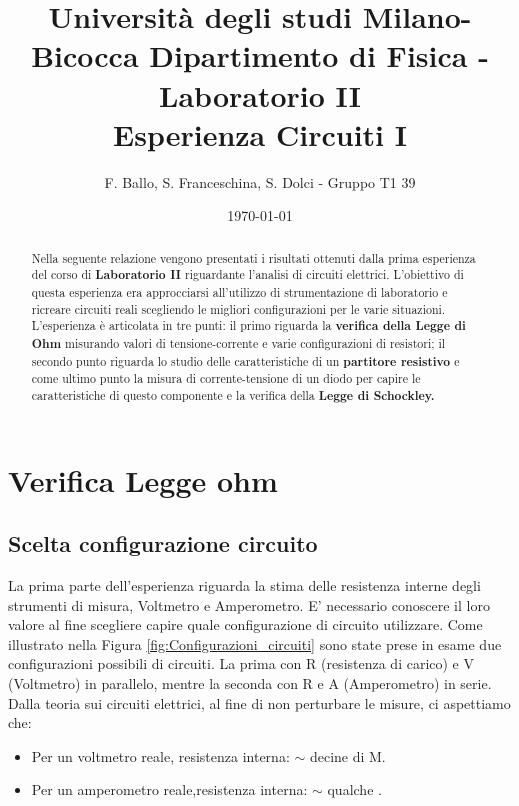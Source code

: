\documentclass[letterpaper,12pt]{article}
\begin{document}
\title{{\small Università degli studi Milano-Bicocca  Dipartimento di Fisica - Laboratorio II }\\
    Esperienza Circuiti I}
\author{F. Ballo, S. Franceschina, S. Dolci - Gruppo T1 39}
\date{\today}
\maketitle
\thispagestyle{logoheader}


\begin{abstract}

\begin{adjustwidth}{-1cm}{-1cm}
Nella seguente relazione vengono presentati i risultati ottenuti dalla prima esperienza del corso di \textbf{ Laboratorio II} riguardante l'analisi di circuiti elettrici. L'obiettivo di questa esperienza era approcciarsi all'utilizzo di strumentazione di laboratorio e ricreare circuiti reali scegliendo le migliori configurazioni per le varie situazioni. L'esperienza è articolata in tre punti: il primo riguarda la \textbf{verifica della Legge di Ohm} misurando valori di tensione-corrente e varie configurazioni di resistori; il secondo punto riguarda lo studio delle caratteristiche di un \textbf{partitore resistivo} e come ultimo punto la misura di corrente-tensione di un diodo per capire le caratteristiche di questo componente e la verifica della \textbf{Legge di Schockley.}
\end{adjustwidth}
\end{abstract}
\tableofcontents
\newpage
\section{Verifica Legge ohm}

\subsection{Scelta configurazione circuito}

La prima parte dell'esperienza riguarda la stima delle resistenza interne degli strumenti di misura, Voltmetro e Amperometro. E' necessario conoscere il loro valore  al fine scegliere capire quale configurazione di circuito utilizzare. Come illustrato nella Figura \ref{fig:Configurazioni_circuiti} sono state prese in esame due configurazioni possibili di circuiti. La prima con R (resistenza di carico) e V (Voltmetro) in parallelo, mentre la seconda con R e A (Amperometro) in serie.
Dalla teoria sui circuiti elettrici, al fine di non perturbare le misure, ci aspettiamo che:
\begin{itemize}
    \item Per un voltmetro reale, resistenza interna: $\sim$ decine di M\textohm.
    \item Per un amperometro reale,resistenza interna: $\sim$ qualche \textohm.
\end{itemize}
\end{document}
